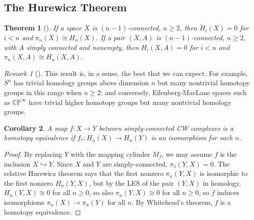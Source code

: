 \documentclass[reqno]{amsart}
\newtheorem{theorem}{Theorem}[section]
\newtheorem{corollary}[theorem]{Corollary}
\theoremstyle{definition}
\theoremstyle{remark}
\newtheorem*{remark}{Remark}
\begin{document}
\subsection{The Hurewicz Theorem}

\begin{theorem}[]
    If a space $X$ is $(n-1)$-connected, $n\ge 2$,
    then $\tilde{H}_i (X) = 0$ for 
    $i < n$ and $\pi_n (X) \cong
    H_n (X)$. If a pair $(X,A)$ is $(n-1)$-connected,
    $n \ge 2$, with $A$ simply connected
    and nonempty, then $H_i (X,A) = 0$ for
    $i < n$ and $\pi_n (X,A) \cong
    H_n (X,A)$.
\end{theorem}

\begin{remark}[]
    This result is, in a sense, the best that we can
    expect. For example, $S^{n}$ has trivial
    homology groups above dimension $n$ but many
    nontrivial homotopy groups in this range
    when $n\ge 2$; and conversely,
    Eilenberg-MacLane spaces such as
    $\mathbb{C}\mathbb{P}^{\infty}$ have trivial
    higher homotopy groups but many nontrivial homology
    groups.
\end{remark}


\begin{corollary}
    A map $f \colon X \to Y$ between simply-connected
    CW complexes is a homotopy equivalence if
    $f_* \colon H_n (X) \to H_n(Y)$ is an isomorphism
    for each $n$.
\end{corollary}

\begin{proof}
    By replacing $Y$ with the mapping cylinder $M_f$, we
    may assume $f$ is the inclusion $X \hookrightarrow Y$.
    Since $X$ and $Y$ are simply-connected,
    $\pi_1 \left( Y,X \right) = 0$. The relative Hurewicz
    theorem says that the first nonzero $\pi_n(Y,X)$ is isomorphic
    to the first nonzero $H_n(Y,X)$, but by the LES
    of the pair $(Y,X)$ in homology,
    $H_n(Y,X) \cong 0$ for all $n\ge 0$, so
    also $\pi_n(Y,X) \cong 0$ for all $n\ge 0$, so
     $f$ induces isomorphisms
     $\pi_n(X) \to \pi_n(Y)$ for all $n$. By
     Whitehead's theorem, $f$ is a homotopy equivalence.
\end{proof}






%


%


\newpage

\printbibliography
\end{document}
